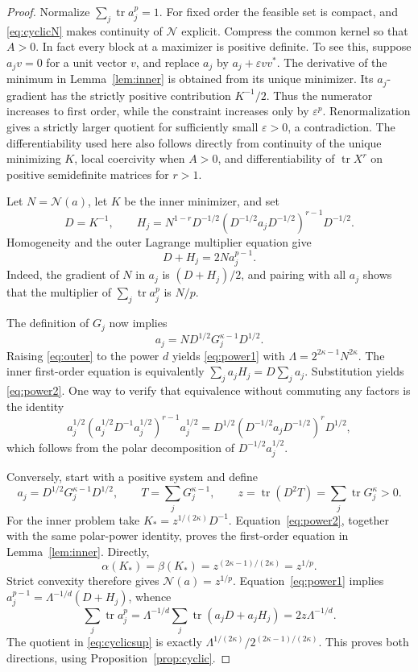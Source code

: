 \documentclass[11pt]{article}
\newcommand{\tr}{\operatorname{tr}}
\newcommand{\N}{\mathcal N}
\theoremstyle{remark}\newtheorem{remark}[theorem]{Remark}
\begin{document}
\begin{proof}
Normalize \(\sum_j\tr a_j^p=1\). For fixed order the feasible set is compact, and \eqref{eq:cyclicN} makes continuity of \(\N\) explicit. Compress the common kernel so that \(A>0\). In fact every block at a maximizer is positive definite. To see this, suppose \(a_jv=0\) for a unit vector \(v\), and replace \(a_j\) by \(a_j+\varepsilon vv^*\). The derivative of the minimum in Lemma~\ref{lem:inner} is obtained from its unique minimizer. Its \(a_j\)-gradient has the strictly positive contribution \(K^{-1}/2\). Thus the numerator increases to first order, while the constraint increases only by \(\varepsilon^p\). Renormalization gives a strictly larger quotient for sufficiently small \(\varepsilon>0\), a contradiction. The differentiability used here also follows directly from continuity of the unique minimizing \(K\), local coercivity when \(A>0\), and differentiability of \(\tr X^r\) on positive semidefinite matrices for \(r>1\).

Let \(N=\N(a)\), let \(K\) be the inner minimizer, and set
\begin{equation}\label{eq:Hdef}
 D=K^{-1},\qquad
 H_j=N^{1-r}D^{-1/2}
       (D^{-1/2}a_jD^{-1/2})^{r-1}D^{-1/2}.
\end{equation}
Homogeneity and the outer Lagrange multiplier equation give
\begin{equation}\label{eq:outer}
 D+H_j=2N a_j^{p-1}.
\end{equation}
Indeed, the gradient of \(N\) in \(a_j\) is \((D+H_j)/2\), and pairing with all \(a_j\) shows that the multiplier of \(\sum_j\tr a_j^p\) is \(N/p\).

The definition of \(G_j\) now implies
\[
 a_j=N D^{1/2}G_j^{\kappa-1}D^{1/2}.
\]
Raising \eqref{eq:outer} to the power \(d\) yields \eqref{eq:power1} with
\(\Lambda=2^{2\kappa-1}N^{2\kappa}\). The inner first-order equation is equivalently
\(\sum_ja_jH_j=D\sum_ja_j\). Substitution yields \eqref{eq:power2}. One way to verify that equivalence without commuting any factors is the identity
\[
 a_j^{1/2}(a_j^{1/2}D^{-1}a_j^{1/2})^{r-1}a_j^{1/2}
 =D^{1/2}(D^{-1/2}a_jD^{-1/2})^rD^{1/2},
\]
which follows from the polar decomposition of \(D^{-1/2}a_j^{1/2}\).

Conversely, start with a positive system and define
\[
 a_j=D^{1/2}G_j^{\kappa-1}D^{1/2},\qquad
 T=\sum_jG_j^{\kappa-1},\qquad z=\tr(D^2T)=\sum_j\tr G_j^\kappa>0.
\]
For the inner problem take \(K_*=z^{1/(2\kappa)}D^{-1}\). Equation~\eqref{eq:power2}, together with the same polar-power identity, proves the first-order equation in Lemma~\ref{lem:inner}. Directly,
\[
 \alpha(K_*)=\beta(K_*)=z^{(2\kappa-1)/(2\kappa)}=z^{1/p}.
\]
Strict convexity therefore gives \(\N(a)=z^{1/p}\). Equation~\eqref{eq:power1} implies \(a_j^{p-1}=\Lambda^{-1/d}(D+H_j)\), whence
\[
 \sum_j\tr a_j^p
 =\Lambda^{-1/d}\sum_j\tr(a_jD+a_jH_j)
 =2z\Lambda^{-1/d}.
\]
The quotient in \eqref{eq:cyclicsup} is exactly
\(\Lambda^{1/(2\kappa)}/2^{(2\kappa-1)/(2\kappa)}\). This proves both directions, using Proposition~\ref{prop:cyclic}.
\end{proof}
\end{document}
